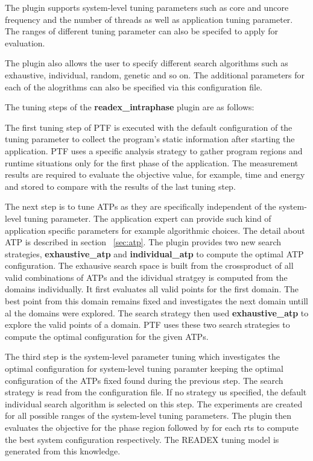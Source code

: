 The plugin supports system-level tuning parameters such as core and uncore frequency and the number of threads as well as application tuning parameter. The ranges of different tuning parameter can also be specifed to apply for evaluation.

The plugin also allows the user to specify different search algorithms such as exhaustive, individual, random, genetic and so on. The additional parameters for each of the alogrithms can also be specified via this configuration file.

The tuning steps of the \textbf{readex\_intraphase} plugin are as follows:

The first tuning step of PTF is executed with the default configuration of the tuning parameter to collect the program's static information after starting the application. PTF uses a specific analysis strategy to gather program regions and runtime situations only for the first phase of the application. The measurement results are required to evaluate the objective value, for example, time and energy and stored to compare with the results of the last tuning step.

The next step is to tune ATPs as they are specifically independent of the system-level tuning parameter. The application expert can provide such kind of application specific parameters for example algorithmic choices. The detail about ATP is described in section ~\ref{sec:atp}. The plugin provides two new search strategies, \textbf{exhaustive\_atp} and \textbf{individual\_atp} to compute the optimal ATP configuration. The exhausive search space is built from the crossproduct of all valid combinations of ATPs and the idividual stratgey is computed from the domains individually. It first evaluates all valid points for the first domain. The best point from this domain remains fixed and investigates the next domain untill al the domains were explored. The search strategy then used \textbf{exhaustive\_atp} to explore the valid points of a domain. PTF uses these two search strategies to compute the optimal configuration for the given ATPs.   

The third step is the system-level parameter tuning which investigates the optimal configuration for system-level tuning paramter keeping the optimal configuration of the ATPs fixed found during the previous step. The search strategy is read from the configuration file. If no strategy us specified, the default individual search algorithm is selected on this step. The experiments are created for all possible ranges of the system-level tuning parameters. The plugin then evaluates the objective for the phase region followed by for each rts to compute the best system configuration respectively. The READEX tuning model is generated from this knowledge. 

